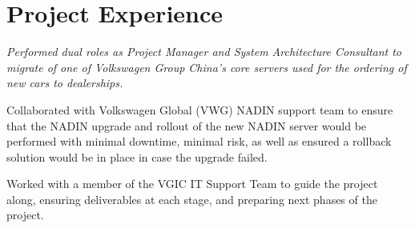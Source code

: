 \documentclass[a4paper]{deedy-resume-proximanova-sanfran} %
\begin{document}
\begin{minipage}[t]{0.66\textwidth}









\section{Project Experience}

\emph{Performed dual roles as Project Manager and System Architecture Consultant to migrate of one of Volkswagen Group China's core servers used for the ordering of new cars to dealerships.}
\begin{tightitemize}
\item Collaborated with Volkswagen Global (VWG) NADIN support team to ensure that the NADIN upgrade and rollout of the new NADIN server would be performed with minimal downtime, minimal risk, as well as ensured a rollback solution would be in place in case the upgrade failed.
\item Worked with a member of the VGIC IT Support Team to guide the project along, ensuring deliverables at each stage, and preparing next phases of the project.
\end{tightitemize}


\end{minipage}
\end{document}
